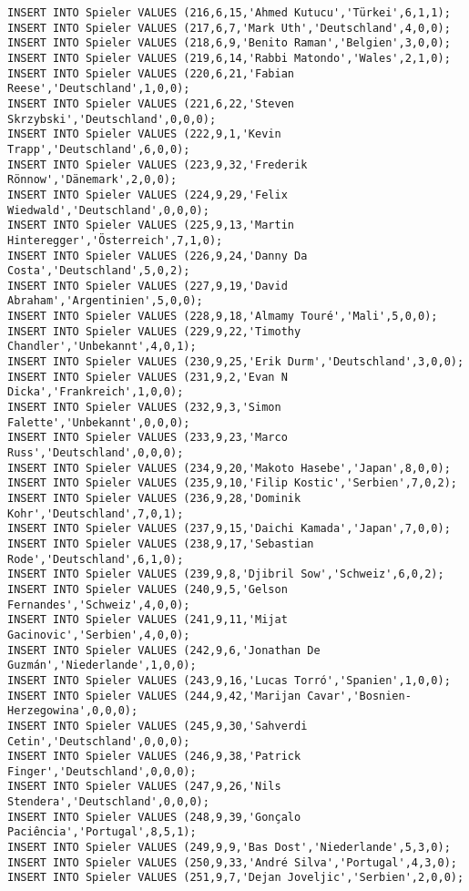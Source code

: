 \documentclass{bschlangaul-aufgabe}
\begin{document}
\begin{verbatim}
INSERT INTO Spieler VALUES (216,6,15,'Ahmed Kutucu','Türkei',6,1,1);
INSERT INTO Spieler VALUES (217,6,7,'Mark Uth','Deutschland',4,0,0);
INSERT INTO Spieler VALUES (218,6,9,'Benito Raman','Belgien',3,0,0);
INSERT INTO Spieler VALUES (219,6,14,'Rabbi Matondo','Wales',2,1,0);
INSERT INTO Spieler VALUES (220,6,21,'Fabian Reese','Deutschland',1,0,0);
INSERT INTO Spieler VALUES (221,6,22,'Steven Skrzybski','Deutschland',0,0,0);
INSERT INTO Spieler VALUES (222,9,1,'Kevin Trapp','Deutschland',6,0,0);
INSERT INTO Spieler VALUES (223,9,32,'Frederik Rönnow','Dänemark',2,0,0);
INSERT INTO Spieler VALUES (224,9,29,'Felix Wiedwald','Deutschland',0,0,0);
INSERT INTO Spieler VALUES (225,9,13,'Martin Hinteregger','Österreich',7,1,0);
INSERT INTO Spieler VALUES (226,9,24,'Danny Da Costa','Deutschland',5,0,2);
INSERT INTO Spieler VALUES (227,9,19,'David Abraham','Argentinien',5,0,0);
INSERT INTO Spieler VALUES (228,9,18,'Almamy Touré','Mali',5,0,0);
INSERT INTO Spieler VALUES (229,9,22,'Timothy Chandler','Unbekannt',4,0,1);
INSERT INTO Spieler VALUES (230,9,25,'Erik Durm','Deutschland',3,0,0);
INSERT INTO Spieler VALUES (231,9,2,'Evan N Dicka','Frankreich',1,0,0);
INSERT INTO Spieler VALUES (232,9,3,'Simon Falette','Unbekannt',0,0,0);
INSERT INTO Spieler VALUES (233,9,23,'Marco Russ','Deutschland',0,0,0);
INSERT INTO Spieler VALUES (234,9,20,'Makoto Hasebe','Japan',8,0,0);
INSERT INTO Spieler VALUES (235,9,10,'Filip Kostic','Serbien',7,0,2);
INSERT INTO Spieler VALUES (236,9,28,'Dominik Kohr','Deutschland',7,0,1);
INSERT INTO Spieler VALUES (237,9,15,'Daichi Kamada','Japan',7,0,0);
INSERT INTO Spieler VALUES (238,9,17,'Sebastian Rode','Deutschland',6,1,0);
INSERT INTO Spieler VALUES (239,9,8,'Djibril Sow','Schweiz',6,0,2);
INSERT INTO Spieler VALUES (240,9,5,'Gelson Fernandes','Schweiz',4,0,0);
INSERT INTO Spieler VALUES (241,9,11,'Mijat Gacinovic','Serbien',4,0,0);
INSERT INTO Spieler VALUES (242,9,6,'Jonathan De Guzmán','Niederlande',1,0,0);
INSERT INTO Spieler VALUES (243,9,16,'Lucas Torró','Spanien',1,0,0);
INSERT INTO Spieler VALUES (244,9,42,'Marijan Cavar','Bosnien-Herzegowina',0,0,0);
INSERT INTO Spieler VALUES (245,9,30,'Sahverdi Cetin','Deutschland',0,0,0);
INSERT INTO Spieler VALUES (246,9,38,'Patrick Finger','Deutschland',0,0,0);
INSERT INTO Spieler VALUES (247,9,26,'Nils Stendera','Deutschland',0,0,0);
INSERT INTO Spieler VALUES (248,9,39,'Gonçalo Paciência','Portugal',8,5,1);
INSERT INTO Spieler VALUES (249,9,9,'Bas Dost','Niederlande',5,3,0);
INSERT INTO Spieler VALUES (250,9,33,'André Silva','Portugal',4,3,0);
INSERT INTO Spieler VALUES (251,9,7,'Dejan Joveljic','Serbien',2,0,0);

\end{verbatim}
\end{document}

